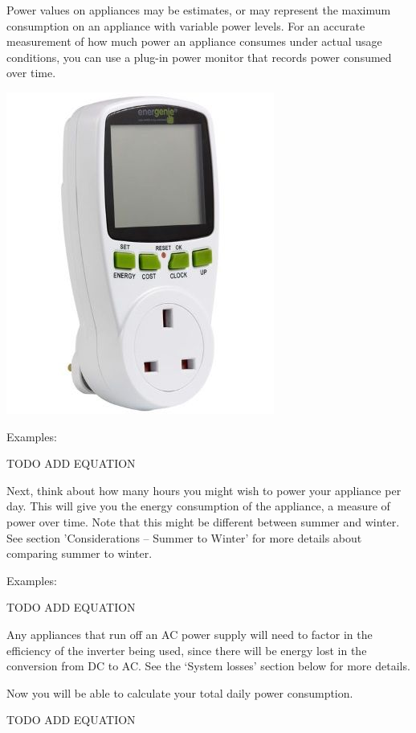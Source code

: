 \documentclass{article}
\theoremstyle{definition}
\theoremstyle{definition}
\theoremstyle{remark}
\begin{document}
    Power values on appliances may be estimates, or may represent the maximum consumption on an appliance with variable power levels. For an accurate measurement of how much power an appliance consumes under actual usage conditions, you can use a plug-in power monitor that records power consumed over time. 

    \begin{center}
      \includegraphics[width=0.15\paperwidth]{../Images/image_12_1_(watt_meter).png}
    \end{center}

    Examples: 

    TODO ADD EQUATION

    Next, think about how many hours you might wish to power your appliance per day. This will give you the energy consumption of the appliance, a measure of power over time. Note that this might be different between summer and winter. See section 'Considerations – Summer to Winter' for more details about comparing summer to winter.

    Examples:

    TODO ADD EQUATION

    Any appliances that run off an AC power supply will need to factor in the efficiency of the inverter being used, since there will be energy lost in the conversion from DC to AC. See the ‘System losses’ section below for more details.

    Now you will be able to calculate your total daily power consumption.
    
    TODO ADD EQUATION
  
\end{document}
